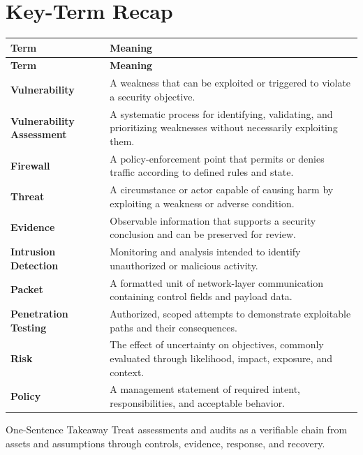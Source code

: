 \documentclass[11pt,letterpaper]{article}
\begin{document}
\section*{Key-Term Recap}
\begin{longtable}{>{\raggedright\arraybackslash}p{}>{\raggedright\arraybackslash}p{}}
\toprule\rowcolor{Navy}\color{white}\textbf{Term} & \color{white}\textbf{Meaning}\\\midrule
\endfirsthead
\toprule\rowcolor{Navy}\color{white}\textbf{Term} & \color{white}\textbf{Meaning}\\\midrule
\endhead
\textbf{Vulnerability} & A weakness that can be exploited or triggered to violate a security objective. \\\midrule
\textbf{Vulnerability Assessment} & A systematic process for identifying, validating, and prioritizing weaknesses without necessarily exploiting them. \\\midrule
\textbf{Firewall} & A policy-enforcement point that permits or denies traffic according to defined rules and state. \\\midrule
\textbf{Threat} & A circumstance or actor capable of causing harm by exploiting a weakness or adverse condition. \\\midrule
\textbf{Evidence} & Observable information that supports a security conclusion and can be preserved for review. \\\midrule
\textbf{Intrusion Detection} & Monitoring and analysis intended to identify unauthorized or malicious activity. \\\midrule
\textbf{Packet} & A formatted unit of network-layer communication containing control fields and payload data. \\\midrule
\textbf{Penetration Testing} & Authorized, scoped attempts to demonstrate exploitable paths and their consequences. \\\midrule
\textbf{Risk} & The effect of uncertainty on objectives, commonly evaluated through likelihood, impact, exposure, and context. \\\midrule
\textbf{Policy} & A management statement of required intent, responsibilities, and acceptable behavior. \\\midrule
\bottomrule
\end{longtable}
\begin{CornellExamBox}{One-Sentence Takeaway}
Treat assessments and audits as a verifiable chain from assets and assumptions through controls, evidence, response, and recovery.
\end{CornellExamBox}
\end{document}
